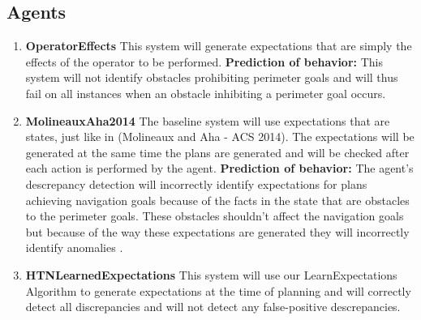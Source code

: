 \documentclass{article}
\begin{document}
\subsection{Agents}
\begin{enumerate}
\item \textbf{OperatorEffects} This system will generate expectations that are simply the effects of the operator to be performed. \textbf{Prediction of behavior:} This system will not identify obstacles prohibiting perimeter goals and will thus fail on all instances when an obstacle inhibiting a perimeter goal occurs.
\item \textbf{MolineauxAha2014} The baseline system will use expectations that are states, just like in (Molineaux and Aha - ACS 2014). The expectations will be generated at the same time the plans are generated and will be checked after each action is performed by the agent. \textbf{Prediction of behavior:} The agent's descrepancy detection will incorrectly identify expectations for plans achieving navigation goals because of the facts in the state that are obstacles to the perimeter goals. These obstacles shouldn't affect the navigation goals but because of the way these expectations are generated they will incorrectly identify anomalies \footnotemark[5]. 
\item \textbf{HTNLearnedExpectations} This system will use our LearnExpectations Algorithm to generate expectations at the time of planning and will correctly detect all discrepancies and will not detect any false-positive descrepancies.
\end{enumerate}
\end{document}
